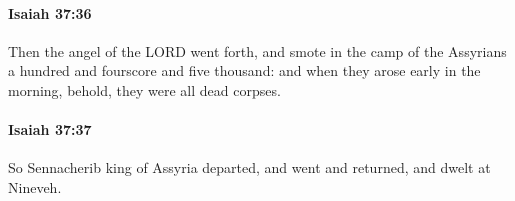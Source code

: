 		\paragraph{Isaiah 37:36} %
			\label{ISAIAH-37-36}

			Then the angel of the LORD went forth, and smote in the camp of the Assyrians a hundred and fourscore and five thousand: and when they arose early in the morning, behold, they were all dead corpses.


		\paragraph{Isaiah 37:37} %
			\label{ISAIAH-37-37}

			So Sennacherib king of Assyria departed, and went and returned, and dwelt at Nineveh.


